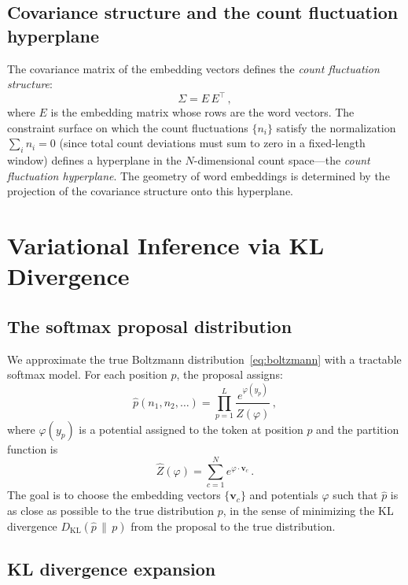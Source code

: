 \documentclass[11pt]{article}
\newcommand{\vw}{\bm{v}}
\newcommand{\KL}{D_{\mathrm{KL}}}
\begin{document}
\subsection{Covariance structure and the count fluctuation hyperplane}

The covariance matrix of the embedding vectors defines the \emph{count fluctuation structure}:
\begin{equation}\label{eq:covariance}
    \Sigma = E\, E^\top\,,
\end{equation}
where $E$ is the embedding matrix whose rows are the word vectors. The constraint surface on which the count fluctuations $\{n_i\}$ satisfy the normalization $\sum_i n_i = 0$ (since total count deviations must sum to zero in a fixed-length window) defines a hyperplane in the $N$-dimensional count space---the \emph{count fluctuation hyperplane}. The geometry of word embeddings is determined by the projection of the covariance structure onto this hyperplane.

\section{Variational Inference via KL Divergence}\label{sec:variational}

\subsection{The softmax proposal distribution}

We approximate the true Boltzmann distribution~\eqref{eq:boltzmann} with a tractable softmax model. For each position $p$, the proposal assigns:
\begin{equation}\label{eq:proposal}
    \hat{p}(n_1, n_2, \ldots) = \prod_{p=1}^{L} \frac{e^{\varphi(y_p)}}{\hat{Z}(\varphi)}\,,
\end{equation}
where $\varphi(y_p)$ is a potential assigned to the token at position $p$ and the partition function is
\begin{equation}\label{eq:partition}
    \hat{Z}(\varphi) = \sum_{c=1}^{N} e^{\varphi \cdot \vw_c}\,.
\end{equation}
The goal is to choose the embedding vectors $\{\vw_c\}$ and potentials $\varphi$ such that $\hat{p}$ is as close as possible to the true distribution $p$, in the sense of minimizing the KL divergence $\KL(\hat{p} \,\|\, p)$ from the proposal to the true distribution.

\subsection{KL divergence expansion}
\end{document}
